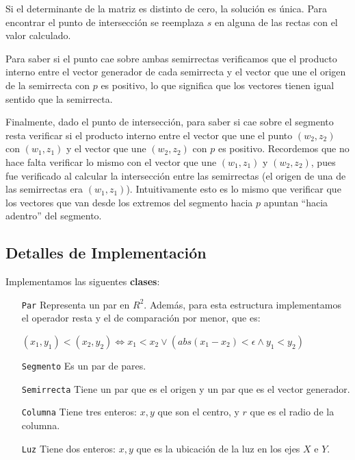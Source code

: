 Si el determinante de la matriz es distinto de cero, la solución es única. Para
encontrar el punto de intersección se reemplaza $s$ en alguna de las rectas con
el valor calculado.

Para saber si el punto cae sobre ambas semirrectas verificamos que el producto
interno entre el vector generador de cada semirrecta y el vector que une el
origen de la semirrecta con $p$ es positivo, lo que significa que los vectores
tienen igual sentido que la semirrecta.

Finalmente, dado el punto de intersección, para saber si cae sobre el
segmento resta verificar si el producto interno entre el vector que une el
punto $(w_2, z_2)$ con $(w_1, z_1)$ y el vector que une $(w_2, z_2)$ con $p$
es positivo. Recordemos que no hace falta verificar lo mismo con el vector
que une $(w_1, z_1)$ y $(w_2, z_2)$, pues fue verificado al calcular la
intersección entre las semirrectas (el origen de una de las semirrectas era
$(w_1, z_1)$). Intuitivamente esto es lo mismo que verificar que los vectores
que van desde los extremos del segmento hacia $p$ apuntan ``hacia adentro''
del segmento.


\subsection*{Detalles de Implementación}

Implementamos las siguentes {\bf clases}:

\begin{itemize}
\item[\tt\small Par] Representa un par en $R^2$. Además, para esta
estructura implementamos el operador resta y el de comparación por menor, que es:

$(x_1, y_1) < (x_2, y_2) \Leftrightarrow x_1 < x_2 \vee ( abs(x_1 - x_2) < \epsilon \wedge y_1 < y_2 )$

\item[\tt\small Segmento] Es un par de pares.

\item[\tt\small Semirrecta] Tiene un par que es el origen y un par que es el vector generador.

\item[\tt\small Columna] Tiene tres enteros: $x,y$ que son el centro, y $r$ que es el radio de la columna.

\item[\tt\small Luz] Tiene dos enteros: $x,y$ que es la ubicación de la luz en los ejes $X$ e $Y$.
\end{itemize}

